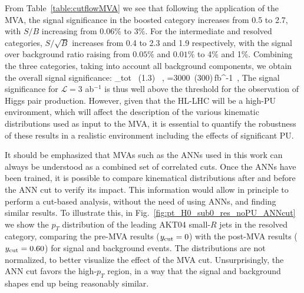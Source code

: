From Table~\ref{table:cutflowMVA} we see that
following the application of the MVA, 
the signal significance in the boosted category increases
from 0.5 to 2.7, with $S/B$ increasing from $0.06\%$ to $3\%$.
%
For the intermediate and resolved categories, $S/\sqrt{B}$
increases from 0.4 to 2.3 and 1.9 respectively, with
the signal over background ratio raising from
$0.05\%$ and $0.01\%$ to 4\% and 1\%.
%
Combining the three categories, taking into
account all background components, we obtain the overall signal
significance:
\be
\lp {}\rp_{\rm tot} ~(1.3) \, ,\quad
{}=3000~(300)\,{\rm fb}^{-1}\, ,
\ee
%
The signal significance for
$\mathcal{L}=3$ ab$^{-1}$
is thus
well above the threshold for the observation of Higgs
pair production.
%
However, given that the HL-LHC will be a high-PU environment,
which will affect the description of the various
kinematic distributions used as input to the MVA,
it is essential to quantify the robustness of these
results
in a realistic environment including the effects of
significant PU.



It should be emphasized that MVAs such as the ANNs used in this work can always be understood as
a combined set of correlated cuts.
%
Once the ANNs have been trained, it is possible to compare  kinematical distributions after and before the ANN  cut to verify its impact.
%
This information would allow in principle to perform a cut-based analysis, without the need of using ANNs,
and finding similar results.
%
To illustrate this,
in Fig.~\ref{fig:pt_H0_sub0_res_noPU_ANNcut} we show
the $p_T$ distribution of the leading AKT04 small-$R$ jets in the resolved
  category, comparing the pre-MVA results ($y_{\rm cut}=0$) with the post-MVA
  results ($y_{\rm cut}=0.60$) for signal and background  events.
  The distributions are not normalized, to better visualize the effect
  of the MVA cut.
  Unsurprisingly, the ANN cut favors the high-$p_T$ region, in a way
  that the signal and background shapes end up being reasonably similar.


